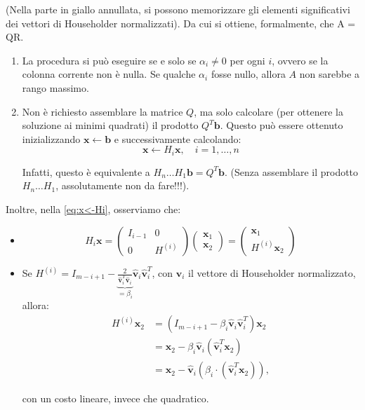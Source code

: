 (Nella parte in \colorbox{yellow!50}{giallo} annullata, si possono memorizzare gli elementi significativi dei vettori di Householder normalizzati).
Da cui si ottiene, formalmente, che A = QR.
\begin{osservazione}
\begin{enumerate}
    \item La procedura si può eseguire se e solo se $\alpha_i \neq 0$ per ogni $i$, ovvero se la colonna corrente non è nulla. Se qualche $\alpha_i$ fosse nullo, allora $A$ non sarebbe a rango massimo.
    \item Non è richiesto assemblare la matrice $Q$, ma solo calcolare (per ottenere la soluzione ai minimi quadrati) il prodotto $Q^T \mathbf{b}$.
    Questo può essere ottenuto inizializzando $\mathbf{x} \leftarrow \mathbf{b}$ e successivamente calcolando:
    \begin{equation} \label{eq:x<-Hi}
        \mathbf{x} \leftarrow H_i \mathbf{x}, \quad i=1, \dots, n 
    \end{equation}
    
    Infatti, questo è equivalente a $H_n \dots H_1 \mathbf{b} = Q^T \mathbf{b}$.
    (Senza assemblare il prodotto $H_n \dots H_1$, assolutamente non da fare!!!).
\end{enumerate}
\end{osservazione}

Inoltre, nella \eqref{eq:x<-Hi}, osserviamo che:
\begin{itemize}
    \item $$ H_i \mathbf{x} = \begin{pmatrix} I_{i-1} & 0 \\ 0 & H^{(i)} \end{pmatrix} \begin{pmatrix} \mathbf{x}_1 \\ \mathbf{x}_2 \end{pmatrix} = \begin{pmatrix} \mathbf{x}_1 \\ H^{(i)} \mathbf{x}_2 \end{pmatrix} $$
    \item Se $H^{(i)} = I_{m-i+1} - \underbrace{\frac{2}{\hat{\mathbf{v}}_i^T \hat{\mathbf{v}}_i}}_{=\beta_i} \hat{\mathbf{v}}_i \hat{\mathbf{v}}_i^T$, con $\hat{\mathbf{v}}_i$ il vettore di Householder normalizzato, allora:\begin{align*}
        H^{(i)} \mathbf{x}_2 &= \left( I_{m-i+1} - \beta_i \hat{\mathbf{v}}_i \hat{\mathbf{v}}_i^T \right) \mathbf{x}_2 \\
        &= \mathbf{x}_2 - \beta_i \hat{\mathbf{v}}_i (\hat{\mathbf{v}}_i^T \mathbf{x}_2) \\
        &= \mathbf{x}_2 - \hat{\mathbf{v}}_i \left( \beta_i \cdot (\hat{\mathbf{v}}_i^T \mathbf{x}_2) \right),
    \end{align*}
    
    con un costo \colorbox{yellow!50}{lineare}, invece che \colorbox{yellow!50}{quadratico}.
    
\end{itemize}


